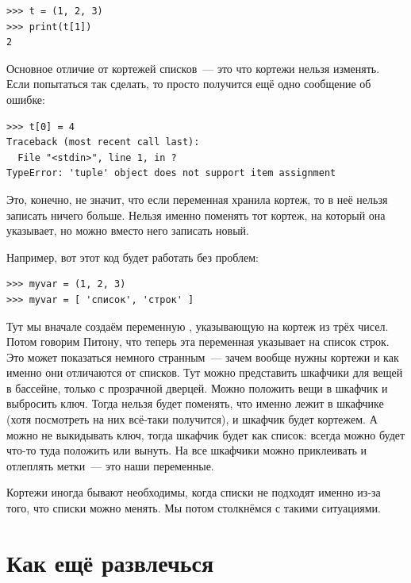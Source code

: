 \begin{listing}
\begin{verbatim}
>>> t = (1, 2, 3)
>>> print(t[1])
2
\end{verbatim}
\end{listing}

Основное отличие от кортежей списков — это что кортежи нельзя изменять. Если попытаться так сделать, то просто получится ещё одно сообщение об ошибке:

\begin{listing}
\begin{verbatim}
>>> t[0] = 4
Traceback (most recent call last):
  File "<stdin>", line 1, in ?
TypeError: 'tuple' object does not support item assignment
\end{verbatim}
\end{listing}

Это, конечно, не значит, что если переменная хранила кортеж, то в неё нельзя записать ничего больше. Нельзя именно поменять тот кортеж, на который она указывает, но можно вместо него записать новый.

Например, вот этот код будет работать без проблем:

\begin{listing}
\begin{verbatim}
>>> myvar = (1, 2, 3)
>>> myvar = [ 'список', 'строк' ]
\end{verbatim}
\end{listing}

Тут мы вначале создаём переменную , указывающую на кортеж из трёх чисел. Потом говорим Питону, что теперь эта переменная указывает на список строк. Это может показаться немного странным — зачем вообще нужны кортежи и как именно они отличаются от списков. Тут можно представить шкафчики для вещей в бассейне, только с прозрачной дверцей. Можно положить вещи в шкафчик и выбросить ключ. Тогда нельзя будет поменять, что именно лежит в шкафчике (хотя посмотреть на них всё-таки получится), и шкафчик будет кортежем. А можно не выкидывать ключ, тогда шкафчик будет как список: всегда можно будет что-то туда положить или вынуть. На все шкафчики можно приклеивать и отлеплять метки — это наши переменные.

Кортежи иногда бывают необходимы, когда списки не подходят именно из-за того, что списки можно менять. Мы потом столкнёмся с такими ситуациями.

\section{Как ещё развлечься}

